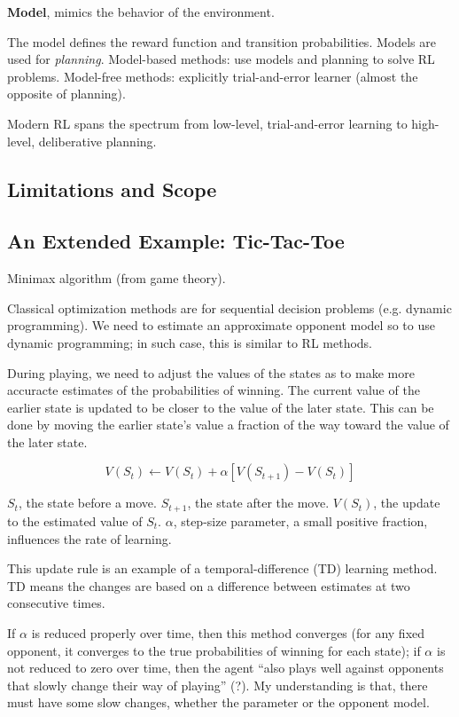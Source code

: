 \documentclass[lang=en,mode=geye,device=normal,color=blue,14pt]{elegantnote}
\DeclareMathOperator*{\1}{\mathbbm{1}}
\begin{document}
\begin{definition}
\textbf{Model}, mimics the behavior of the environment.
\end{definition}

The model defines the reward function and transition probabilities. Models are used for \textit{planning}.
Model-based methods: use models and planning to solve RL problems.
Model-free methods: explicitly trial-and-error learner (almost the opposite of planning).

Modern RL spans the spectrum from low-level, trial-and-error learning to high-level, deliberative planning.

\subsection{Limitations and Scope}
\subsection{An Extended Example: Tic-Tac-Toe}
Minimax algorithm \cite{wiki_minimax} (from game theory).

Classical optimization methods are for sequential decision problems (e.g. dynamic programming). We need to estimate an approximate opponent model so to use dynamic programming; in such case, this is similar to RL methods.

During playing, we need to adjust the values of the states as to make more accuracte estimates of the probabilities of winning. The current value of the earlier state is updated to be closer to the value of the later state. This can be done by moving the earlier state's value a fraction of the way toward the value of the later state.

\begin{equation}
V(S_t) \leftarrow V(S_t) + \alpha[V(S_{t+1}) - V(S_t)]
\end{equation}

$S_t$, the state before a move.
$S_{t+1}$, the state after the move.
$V(S_t)$, the update to the estimated value of $S_t$.
$\alpha$, step-size parameter, a small positive fraction, influences the rate of learning.

This update rule is an example of a temporal-difference (TD) learning method. TD means the changes are based on a difference between estimates at two consecutive times.

If $\alpha$ is reduced properly over time, then this method converges (for any fixed opponent, it converges to the true probabilities of winning for each state); if $\alpha$ is not reduced to zero over time, then the agent ``also plays well against opponents that slowly change their way of playing'' (?). My understanding is that, there must have some slow changes, whether the parameter or the opponent model.
\end{document}
